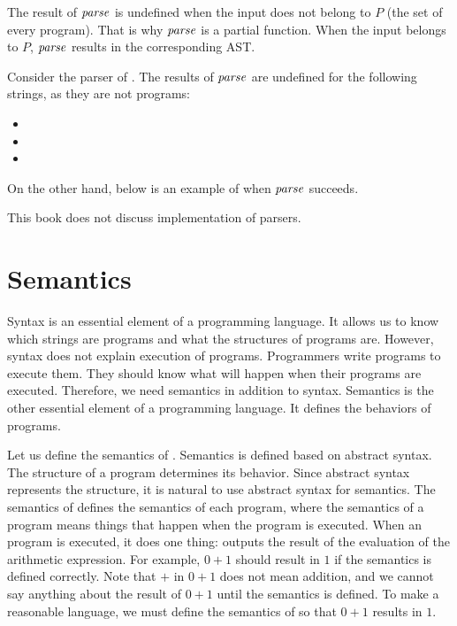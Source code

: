 The result of $\mbox{\emph{parse}}$
is undefined when the input does not belong to $P$ (the set of every
program). That is why $\mbox{\emph{parse}}$ is a partial function. When the input
belongs to $P$, $\mbox{\emph{parse}}$ results in the corresponding AST.

Consider the parser of \lang. The results of $\mbox{\emph{parse}}$ are undefined for
the following strings, as they are not \lang programs:

\begin{itemize}
  \item {}
  \item {}
  \item {}
\end{itemize}

On the other hand, below is an example of when $\mbox{\emph{parse}}$ succeeds.

\begin{center}
\end{center}

This book does not discuss implementation of parsers.

\section{Semantics}

Syntax is an essential element of a programming language. It allows us to know
which strings are programs and what the structures of programs are. However,
syntax does not explain execution of programs. Programmers write programs to
execute them. They should know what will happen when their programs are
executed. Therefore, we need semantics in addition to syntax. Semantics is the
other essential element of a programming language. It defines the behaviors of
programs.

Let us define the semantics of \lang. Semantics is defined based on abstract
syntax. The structure of a program determines its behavior. Since abstract
syntax represents the structure, it is natural to use abstract syntax for
semantics. The semantics of \lang defines the semantics of each \lang program,
where the semantics of a program means things that happen when the program is
executed. When an \lang program is executed, it does one thing: outputs the
result of the evaluation of the arithmetic expression.
For example, $0+1$ should result
in $1$ if the semantics is defined correctly. Note that $+$ in $0+1$ does not
mean addition, and we cannot say anything about the result of $0+1$ until the
semantics is defined. To make \lang a reasonable language, we must define the
semantics of \lang so that $0+1$ results in $1$.

